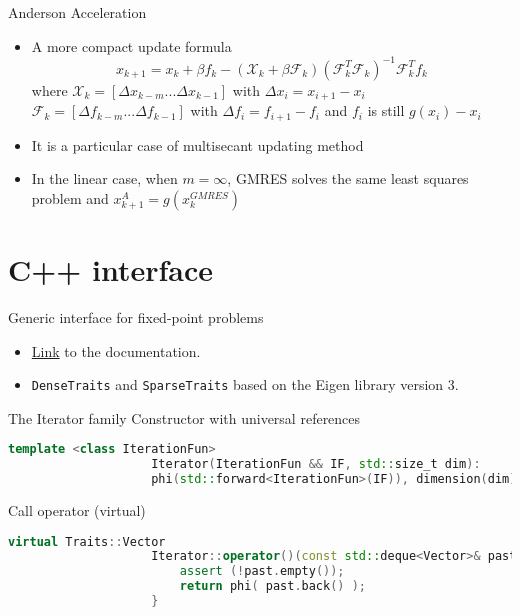 \documentclass{beamer}
\begin{document}
				\begin{frame}{Anderson Acceleration}
					\begin{itemize}
						\item A more compact update formula
						\begin{equation*}
							x_{k+1}=x_{k} + \beta f_k -(\mathscr{X}_k + \beta \mathscr{F}_k)(\mathscr{F}_k^T \mathscr{F}_k)^{-1}\mathscr{F}_k^T f_k
						\end{equation*}
						where
						$\mathscr{X}_k=[\Delta x_{k-m}...\Delta x_{k-1}]$ with $\Delta x_{i}=x_{i+1}-x_i$  
						$\mathscr{F}_k=[\Delta f_{k-m}...\Delta f_{k-1}]$ with $\Delta f_{i}=f_{i+1}-f_i$ and $f_i$ is still $g(x_i)-x_{i}$
						\item It is a particular case of multisecant updating method \cite{Fang}
						\item In the linear case, when $m = \infty$, GMRES solves the same least squares problem and $x_{k+1}^A = g(x_k^{GMRES})$
					\end{itemize}
				\end{frame}
					
				\section{C++ interface}
				
				\begin{frame}{Generic interface for fixed-point problems}
					\begin{itemize}
					\item	\href{file:///D:/VM/progetto/src/html/index.html}{Link} to the documentation.
					\item \texttt{DenseTraits} and \texttt{SparseTraits} based on the Eigen library version 3.
				\end{itemize}
				\end{frame}
				
				\begin{frame}[fragile]{The Iterator family}
					Constructor with universal references
						\begin{lstlisting}[basicstyle=\scriptsize, language=C++]
					template <class IterationFun>
					Iterator(IterationFun && IF, std::size_t dim):
					phi(std::forward<IterationFun>(IF)), dimension(dim){}
						\end{lstlisting}
						Call operator (virtual)
						\begin{lstlisting}[basicstyle=\scriptsize, language=C++]
					virtual Traits::Vector
					Iterator::operator()(const std::deque<Vector>& past){
					    assert (!past.empty());
					    return phi( past.back() );
					}
						\end{lstlisting}

				\end{frame}
				
\end{document}
